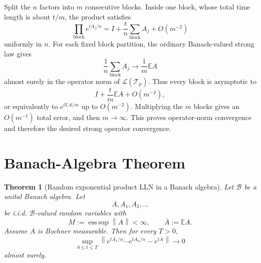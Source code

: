\documentclass[11pt]{article}
\newtheorem{theorem}{Theorem}
\newcommand{\E}{\mathbb E}
\newcommand{\calT}{\mathcal T}
\newcommand{\calL}{\mathcal L}
\newcommand{\calB}{\mathcal B}
\newcommand{\norm}[1]{\left\lVert #1\right\rVert}
\begin{document}
Split the \(n\) factors into \(m\) consecutive blocks.  Inside one block, whose total time length is about \(t/m\), the product satisfies
\[
  \prod_{\text{block}} e^{tA_j/n}
  =
  I+\frac{t}{n}\sum_{\text{block}} A_j + O(m^{-2})
\]
uniformly in \(n\).  For each fixed block partition, the ordinary Banach-valued strong law gives
\[
  \frac1n\sum_{\text{block}} A_j \longrightarrow \frac1m \E A
\]
almost surely in the operator norm of \(\calL(\calT_p)\).  Thus every block is asymptotic to
\[
  I+\frac{t}{m}\E A+O(m^{-2}),
\]
or equivalently to \(e^{t\E A/m}\) up to \(O(m^{-2})\).  Multiplying the \(m\) blocks gives an \(O(m^{-1})\) total error, and then \(m\to\infty\).  This proves operator-norm convergence and therefore the desired strong operator convergence.

\section*{Banach-Algebra Theorem}

\begin{theorem}[Random exponential product LLN in a Banach algebra]\label{thm:banach-algebra}
Let \(\calB\) be a unital Banach algebra.  Let
\[
  A,A_1,A_2,\ldots
\]
be i.i.d. \(\calB\)-valued random variables with
\[
  M:=\operatorname*{ess\,sup}\norm{A}<\infty,
  \qquad
  \bar A:=\E A.
\]
Assume \(A\) is Bochner measurable.  Then for every \(T>0\),
\[
  \sup_{0\le t\le T}
  \norm{
    e^{tA_1/n}\cdots e^{tA_n/n}-e^{t\bar A}
  }
  \longrightarrow 0
\]
almost surely.
\end{theorem}
\end{document}
